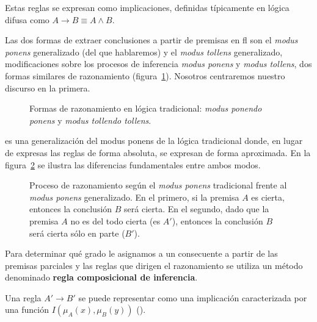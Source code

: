 Estas reglas se expresan como implicaciones, definidas típicamente en lógica difusa como $A \rightarrow B \equiv A \land B$.

Las dos formas de extraer conclusiones a partir de premisas en \gls{fl} son el \textit{modus ponens} generalizado (del que hablaremos) y el \textit{modus tollens} generalizado, modificaciones sobre los procesos de inferencia \textit{modus ponens} y \textit{modus tollens}, dos formas similares de razonamiento (figura~\ref{fig:modus-ponens-and-modus-tollens}). Nosotros centraremos nuestro discurso en la primera.

\begin{figure}
	\caption[\textit{Modus ponendo ponens} vs. \textit{modus tollendo tollens}]{Formas de razonamiento en lógica tradicional: \textit{modus ponendo ponens} y \textit{modus tollendo tollens}.}
	\label{fig:modus-ponens-and-modus-tollens}
\end{figure}

 es una generalización del modus ponens de la lógica tradicional donde, en lugar de expresas las reglas de forma absoluta, se expresan de forma aproximada. En la figura~\ref{fig:modus-ponens-traditional-vs-generalized} se ilustra las diferencias fundamentales entre ambos modos.

\begin{figure}
	\caption[Diferencias entre \textit{modus ponens} tradicional y generalizado]{Proceso de razonamiento según el \textit{modus ponens} tradicional frente al \textit{modus ponens} generalizado. En el primero, si la premisa $A$ es cierta, entonces la conclusión $B$ será cierta. En el segundo, dado que la premisa $A$ no es del todo cierta (es $A'$), entonces la conclusión $B$ será cierta sólo en parte ($B'$).}
	\label{fig:modus-ponens-traditional-vs-generalized}
\end{figure}

Para determinar qué grado le asignamos a un consecuente a partir de las premisas parciales y las reglas que dirigen el razonamiento se utiliza un método denominado \textbf{regla composicional de inferencia}.

Una regla $A' \rightarrow B'$ se puede representar como una implicación caracterizada por una función $I(\mu_A(x), \mu_B(y))$ (\cite{Fuller1993}).

